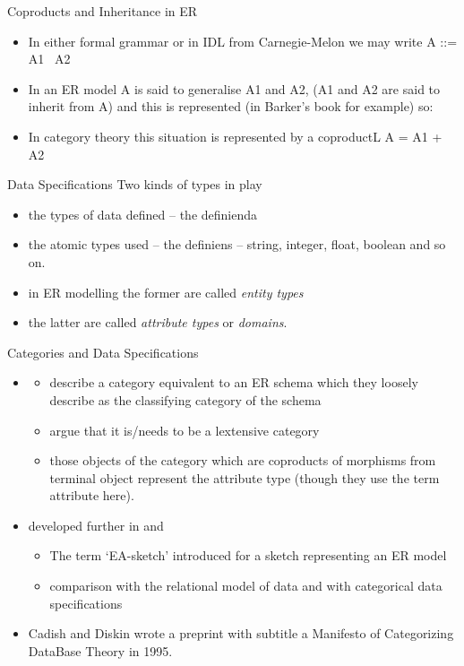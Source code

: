 \documentclass[xcolor=pst,dvips]{beamer}   %
\renewcommand{\erpictureFolder}[0]{../SharedPictures}
\begin{document}
\begin{frame}{Coproducts and Inheritance in ER}
\begin{itemize}
\pause \item In either formal grammar or in IDL from Carnegie-Melon we may write A ::= A1 \textbar\  A2
\pause \item In an ER model  A is said to generalise A1 and A2, (A1 and A2 are said to inherit from A) and this is represented
(in Barker's book for example) so:
\begin{center}
\scalebox{0.85}{

}
\end{center}
\pause \item In category theory this situation is represented by a coproductL A = A1 + A2  
\end{itemize}
\end{frame}

\begin{frame}{Data Specifications}
Two kinds of types in play
\begin{itemize}
\item the types of data defined -- the definienda
\pause \item the atomic types used -- the definiens  -- string, integer, float, boolean and so on.
\pause \item in ER modelling the former are called \textit{entity types}
\pause \item the latter are called \textit{attribute types} or \textit{domains}.
\end{itemize}
\end{frame}

\begin{frame}{Categories and Data Specifications}
\begin{itemize} \footnotesize
\item  \cite{Johnson93} 
\begin{itemize} 
\item describe a category equivalent to an ER schema which they loosely describe as the classifying category of the schema
\item argue that it is/needs to be a lextensive category
\item those objects of the category which are coproducts of morphisms from terminal object represent the attribute type (though they use the term attribute here).
\end{itemize}
\pause \item developed further in \cite{johnson2002REL} and \cite{Johnson2002ERA}
\begin{itemize} \footnotesize
\pause \item The term `EA-sketch' introduced for a sketch representing an ER model 
\pause \item comparison with the relational model of data and with categorical data specifications\cite{piessens1995}
\end{itemize}
\pause \item Cadish and Diskin wrote a preprint with subtitle a Manifesto of Categorizing DataBase Theory in 1995.
\end{itemize}
\end{frame}
\end{document}
